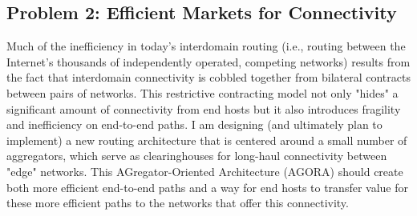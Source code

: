 \subsection*{Problem 2: Efficient Markets for Connectivity}

Much of the inefficiency in today's interdomain routing (i.e., routing
between the Internet's thousands of independently operated, competing
networks) results from the fact that interdomain connectivity is cobbled
together from bilateral contracts between pairs of networks.  This
restrictive contracting model not only "hides" a significant amount of
connectivity from end hosts but it also introduces fragility and
inefficiency on end-to-end paths.  I am designing (and ultimately plan
to implement) a new routing architecture that is centered around a small
number of aggregators, which serve as clearinghouses for long-haul
connectivity between "edge" networks.  This AGregator-Oriented
Architecture (AGORA) should create both more efficient end-to-end paths
and a way for end hosts to transfer value for these more efficient paths
to the networks that offer this connectivity.
